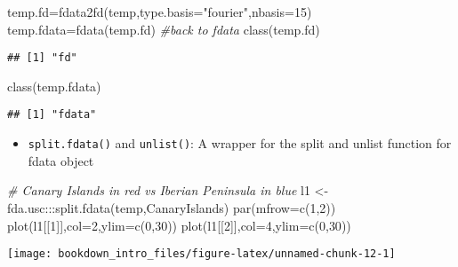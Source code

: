 \documentclass[
]{book}
\newenvironment{Shaded}{\begin{snugshade}}{\end{snugshade}}
\newcommand{\AttributeTok}[1]{\textcolor[rgb]{0.77,0.63,0.00}{#1}}
\newcommand{\CommentTok}[1]{\textcolor[rgb]{0.56,0.35,0.01}{\textit{#1}}}
\newcommand{\DecValTok}[1]{\textcolor[rgb]{0.00,0.00,0.81}{#1}}
\newcommand{\FunctionTok}[1]{\textcolor[rgb]{0.00,0.00,0.00}{#1}}
\newcommand{\NormalTok}[1]{#1}
\newcommand{\OtherTok}[1]{\textcolor[rgb]{0.56,0.35,0.01}{#1}}
\newcommand{\SpecialCharTok}[1]{\textcolor[rgb]{0.00,0.00,0.00}{#1}}
\newcommand{\StringTok}[1]{\textcolor[rgb]{0.31,0.60,0.02}{#1}}
\providecommand{\tightlist}{%
  \setlength{\itemsep}{0pt}\setlength{\parskip}{0pt}}
\begin{document}
\begin{Shaded}
\begin{Highlighting}[]
\NormalTok{temp.fd}\OtherTok{=}\FunctionTok{fdata2fd}\NormalTok{(temp,}\AttributeTok{type.basis=}\StringTok{"fourier"}\NormalTok{,}\AttributeTok{nbasis=}\DecValTok{15}\NormalTok{)}
\NormalTok{temp.fdata}\OtherTok{=}\FunctionTok{fdata}\NormalTok{(temp.fd) }\CommentTok{\#back to fdata}
\FunctionTok{class}\NormalTok{(temp.fd)}
\end{Highlighting}
\end{Shaded}

\begin{verbatim}
## [1] "fd"
\end{verbatim}

\begin{Shaded}
\begin{Highlighting}[]
\FunctionTok{class}\NormalTok{(temp.fdata)}
\end{Highlighting}
\end{Shaded}

\begin{verbatim}
## [1] "fdata"
\end{verbatim}

\begin{itemize}
\tightlist
\item
  \texttt{split.fdata()} and \texttt{unlist()}: A wrapper for the split and unlist function for fdata object
\end{itemize}

\begin{Shaded}
\begin{Highlighting}[]
\CommentTok{\# Canary Islands in red vs Iberian Peninsula in blue}
\NormalTok{l1 }\OtherTok{\textless{}{-}}\NormalTok{ fda.usc}\SpecialCharTok{:::}\FunctionTok{split.fdata}\NormalTok{(temp,CanaryIslands)}
\FunctionTok{par}\NormalTok{(}\AttributeTok{mfrow=}\FunctionTok{c}\NormalTok{(}\DecValTok{1}\NormalTok{,}\DecValTok{2}\NormalTok{))}
\FunctionTok{plot}\NormalTok{(l1[[}\DecValTok{1}\NormalTok{]],}\AttributeTok{col=}\DecValTok{2}\NormalTok{,}\AttributeTok{ylim=}\FunctionTok{c}\NormalTok{(}\DecValTok{0}\NormalTok{,}\DecValTok{30}\NormalTok{))}
\FunctionTok{plot}\NormalTok{(l1[[}\DecValTok{2}\NormalTok{]],}\AttributeTok{col=}\DecValTok{4}\NormalTok{,}\AttributeTok{ylim=}\FunctionTok{c}\NormalTok{(}\DecValTok{0}\NormalTok{,}\DecValTok{30}\NormalTok{))}
\end{Highlighting}
\end{Shaded}

\begin{center}\texttt{[image: bookdown\_intro\_files/figure-latex/unnamed-chunk-12-1]} \end{center}
\end{document}
